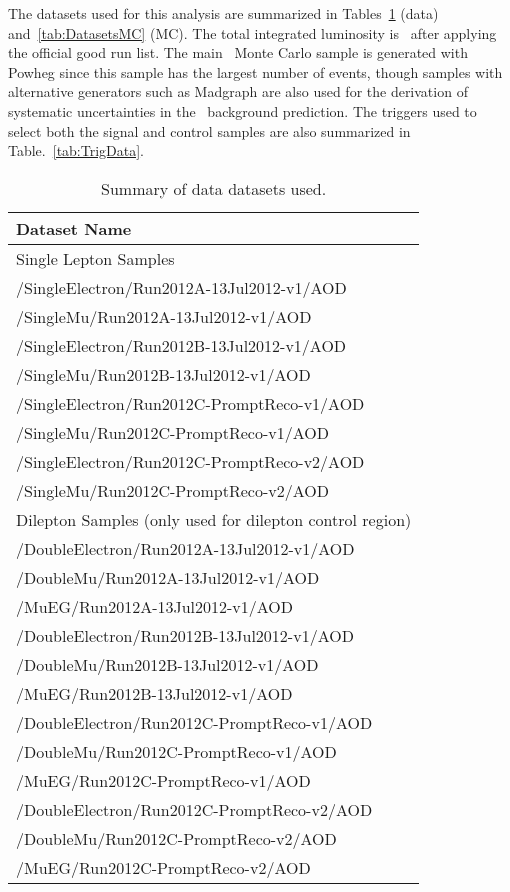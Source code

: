 
The datasets used for this analysis are summarized in 
Tables~\ref{tab:DatasetsData} (data) and~\ref{tab:DatasetsMC} (MC).
The total integrated luminosity is \lumi\ after
applying the official good run list. 
The main \ttbar\ Monte Carlo
sample is generated with Powheg since this sample has the largest number of events, 
though samples with alternative generators such as Madgraph %
are also used for
the derivation of systematic uncertainties in the \ttbar~background prediction. 
The triggers used to select both the signal and control samples are
also summarized in Table.~\ref{tab:TrigData}.

\begin{table}[!ht]
\begin{center}
\begin{tabular}{l}
\hline
Dataset Name   \\
\hline
\hline
Single Lepton Samples \\
\hline
  /SingleElectron/Run2012A-13Jul2012-v1/AOD   \\
  /SingleMu/Run2012A-13Jul2012-v1/AOD   \\
  /SingleElectron/Run2012B-13Jul2012-v1/AOD   \\
  /SingleMu/Run2012B-13Jul2012-v1/AOD   \\
  /SingleElectron/Run2012C-PromptReco-v1/AOD   \\         
  /SingleMu/Run2012C-PromptReco-v1/AOD   \\         
  /SingleElectron/Run2012C-PromptReco-v2/AOD   \\         
  /SingleMu/Run2012C-PromptReco-v2/AOD   \\         
\hline
\hline
Dilepton Samples (only used for dilepton control region)\\
\hline
  /DoubleElectron/Run2012A-13Jul2012-v1/AOD   \\
  /DoubleMu/Run2012A-13Jul2012-v1/AOD   \\
  /MuEG/Run2012A-13Jul2012-v1/AOD   \\
  /DoubleElectron/Run2012B-13Jul2012-v1/AOD   \\
  /DoubleMu/Run2012B-13Jul2012-v1/AOD   \\
  /MuEG/Run2012B-13Jul2012-v1/AOD   \\
  /DoubleElectron/Run2012C-PromptReco-v1/AOD   \\         
  /DoubleMu/Run2012C-PromptReco-v1/AOD   \\         
  /MuEG/Run2012C-PromptReco-v1/AOD   \\         
  /DoubleElectron/Run2012C-PromptReco-v2/AOD   \\         
  /DoubleMu/Run2012C-PromptReco-v2/AOD   \\         
  /MuEG/Run2012C-PromptReco-v2/AOD   \\         
\hline
\end{tabular}
\caption{Summary of data datasets used.\label{tab:DatasetsData}}
\end{center}
\end{table}

